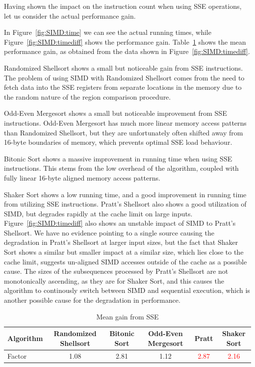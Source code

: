Having shown the impact on the instruction count when using SSE operations, let us consider the actual performance gain.

In Figure~\ref{fig:SIMD:time} we can see the actual running times, while Figure~\ref{fig:SIMD:timediff} shows the performance gain. Table~\ref{tab:SIMD:timediffavg} shows the mean performance gain, as obtained from the data shown in Figure~\ref{fig:SIMD:timediff}.

Randomized Shellsort shows a small but noticeable gain from SSE instructions. The problem of using SIMD with Randomized Shellsort comes from the need to fetch data into the SSE registers from separate locations in the memory due to the random nature of the region comparison procedure.

Odd-Even Mergesort shows a small but noticeable improvement from SSE instructions. Odd-Even Mergesort has much more linear memory access patterns than Randomized Shellsort, but they are unfortunately often shifted away from 16-byte boundaries of memory, which prevents optimal SSE load behaviour. 

Bitonic Sort shows a massive improvement in running time when using SSE instructions. This stems from the low overhead of the algorithm, coupled with fully linear 16-byte aligned memory access patterns. 

Shaker Sort shows a low running time, and a good improvement in running time from utilizing SSE instructions. Pratt's Shellsort also shows a good utilization of SIMD, but degrades rapidly at the cache limit on large inputs. Figure~\ref{fig:SIMD:timediff} also shows an unstable impact of SIMD to Pratt's Shellsort. We have no evidence pointing to a single source causing the degradation in Pratt's Shellsort at larger input sizes, but the fact that Shaker Sort shows a similar but smaller impact at a similar size, which lies close to the cache limit, suggests un-aligned SIMD accesses outside of the cache as a possible cause. The sizes of the subsequences processed by Pratt's Shellsort are not monotonically ascending, as they are for Shaker Sort, and this causes the algorithm to continously switch between SIMD and sequential execution, which is another possible cause for the degradation in performance.

\begin{table}[!h]
\begin{adjustwidth}{-.5in}{-.5in}
\centering
\begin{tabular}{|l|c|c|c|c|c|}
\hline
Algorithm & Randomized Shellsort & Bitonic Sort & Odd-Even Mergesort & Pratt & Shaker Sort \\ \hline
Factor    & 1.08                 & 2.81         & 1.12 & \textcolor{red}{2.87} & \textcolor{red}{2.16}              \\ \hline
\end{tabular}
\caption{Mean gain from SSE}
\label{tab:SIMD:timediffavg}
    \end{adjustwidth}
\end{table}

